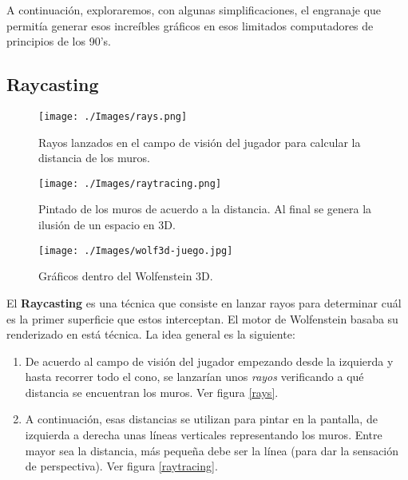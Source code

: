 A continuación, exploraremos, con algunas simplificaciones, el engranaje que permitía generar esos increíbles gráficos en esos limitados computadores de principios de los 90's.

\newpage
\subsection{Raycasting}

\begin{wrapfigure}{r}{0.4\textwidth}
	\begin{center}
		\texttt{[image: ./Images/rays.png]}
	\end{center}	
	\caption{Rayos lanzados en el campo de visión del jugador para calcular la distancia de los muros. \newline}
	\label{rays}
	
	\begin{center}
		\texttt{[image: ./Images/raytracing.png]}
	\end{center}	
	\caption{Pintado de los muros de acuerdo a la distancia. Al final se genera la ilusión de un espacio en 3D. \newline}
	\label{raytracing}
	
	\begin{center}
		\texttt{[image: ./Images/wolf3d-juego.jpg]}
	\end{center}
	\caption{Gráficos dentro del Wolfenstein 3D.}
	\label{wolf3d-inside}

\end{wrapfigure}

El \textbf{Raycasting} es una técnica que consiste en lanzar rayos para determinar cuál es la primer superficie que estos interceptan. El motor de Wolfenstein basaba su renderizado en está técnica. La idea general es la siguiente:

\begin{enumerate}
	\item De acuerdo al campo de visión del jugador empezando desde la izquierda y hasta recorrer todo el cono, se lanzarían unos \emph{rayos} verificando a qué distancia se encuentran los muros. Ver figura \ref{rays}.
	
	\item A continuación, esas distancias se utilizan para pintar en la pantalla, de izquierda a derecha unas líneas verticales representando los muros. Entre mayor sea la distancia, más pequeña debe ser la línea (para dar la sensación de perspectiva). Ver figura \ref{raytracing}.
\end{enumerate}

